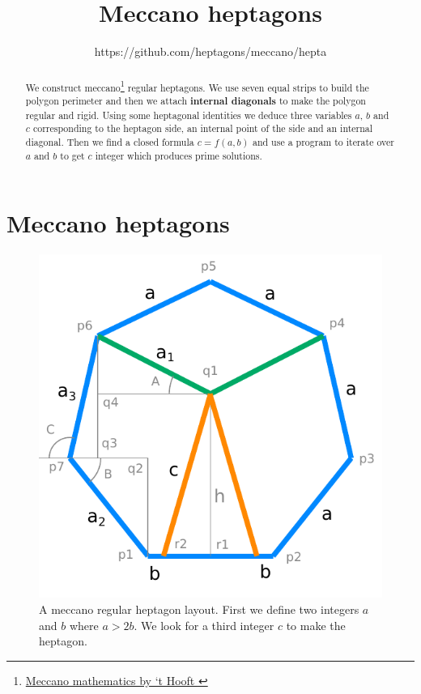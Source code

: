 \documentclass[11pt]{article}
\title{\textbf{Meccano heptagons}}
\author{https://github.com/heptagons/meccano/hepta}
\date{}
\begin{document}
\maketitle
\begin{abstract}
We construct meccano\footnote{
\href{https://webspace.science.uu.nl/~hooft101/lectures/meccano.pdf}{Meccano mathematics by `t Hooft }
}
regular heptagons.
We use seven equal strips to build the polygon perimeter and then we attach \textbf{internal diagonals} to make the polygon regular and rigid. Using some
heptagonal identities we deduce three variables $a$, $b$ and $c$ corresponding
to the heptagon side, an internal point of the side and an internal diagonal.
Then we find a closed formula $c = f(a,b)$ and use a program to iterate over $a$ and
$b$ to get $c$ integer which produces prime solutions.
\end{abstract}

\section{Meccano heptagons}

\begin{figure}[htp]
\centering
\includegraphics[scale=1]{figs/heptagon_plan.pdf}
\caption{A meccano regular heptagon layout. First we define two integers $a$ and $b$ where $a > 2b$. We look for a third integer $c$ to make the heptagon.}
\label{heptagonplan}
\end{figure}
\end{document}
